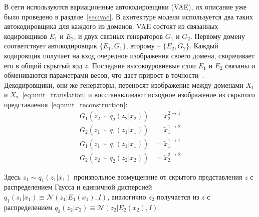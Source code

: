 \documentclass[11pt,a4paper]{extarticle}
\begin{document}
{		В сети используются вариационные автокодировщики (VAE), их описание уже было проведено в разделе~\ref{sec:vae}. В ахитектуре модели используется два таких автокодировщика для каждого из доменов.
		VAE состоят из связанных кодировщиков \(E_1\) и \(E_2\), и двух связных генераторов \(G_1\) и \(G_2\).
		Первому домену соответствует автокодировщик \(\{ E_1,G_1 \}\), второму -- \(\{ E_2,G_2 \}\).
		Каждый кодировщик получает на вход очередное изображения своего домена, сворачивает его в общий скрытый код \(z\).
		Последние высокоуровневые слои \(E_1\) и \(E_2\) связаны и обмениваются параметрами весов, что дает прирост в точности~\cite{coGAN}.
		Декодировщики, они же генераторы, переносят изображение между доменами \(X_1\) и \(X_2\)~\eqref{eq:unit_translation} и восстанавливают исходное изображение из скрытого представления~\eqref{eq:unit_reconstruction}:
		\begin{equation}\label{eq:unit_translation}
			\begin{aligned}
				G_1(z_2 \sim q_2(z_2|x_2)) &= \tilde{x}^{2 \rightarrow 1}_2 \\
				G_2(z_1 \sim q_1(z_1|x_1)) &= \tilde{x}^{1 \rightarrow 2}_1 
			\end{aligned}
		\end{equation}
		\begin{equation}\label{eq:unit_reconstruction}
			\begin{aligned}
				G_1(z_1 \sim q_1(z_1|x_1)) &= \tilde{x}^{1 \rightarrow 1}_1 \\
				G_2(z_2 \sim q_2(z_2|x_2)) &= \tilde{x}^{2 \rightarrow 2}_2
			\end{aligned}
		\end{equation}

		\noindent
		Здесь \(z_1 \sim q_1(z_1|x_1)\) произвольное возмущенние от скрытого представления \(z\) с распределением Гаусса и единичной дисперсией \(q_1(z_1|x_1) \equiv \mathcal{N}(z_1|E_1(x_1), I)\),
		аналогично \(z_2\) получается из \(z\) с распределением \(q_2(z_2|x_2) \equiv \mathcal{N}(z_2|E_2(x_2), I)\).

}
\end{document}
